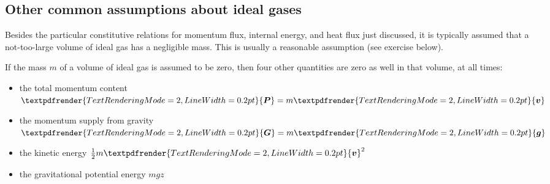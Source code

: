 \documentclass[a4paper,12pt,%
onecolumn,oneside,%
british%
]{memoir}
\renewcommand*{\bm}[1]{\textpdfrender{TextRenderingMode=2,LineWidth=0.2pt}{\boldsymbol{#1}}}
\renewcommand*{\|}[1][]{\nonscript\:#1\vert\nonscript\:\mathopen{}}
\newcommand*{\yg}{\bm{g}} %
\newcommand*{\yv}{\bm{v}}
\newcommand*{\ym}{m}%
\newcommand*{\yP}{\bm{P}}
\newcommand*{\yG}{\bm{G}}
\begin{document}
\subsection{Other common assumptions about ideal gases}
\label{sec:further_idealgas}

Besides the particular constitutive relations for momentum flux, internal energy, and heat flux just discussed, it is typically assumed that a not-too-large volume of ideal gas has a negligible mass. This is usually a reasonable assumption (see exercise below).

If the mass $\ym$ of a volume of ideal gas is assumed to be zero, then four other quantities are zero as well in that volume, at all times:
\begin{itemize}[nosep]
\item the total momentum content $\yP=\ym\yv$
\item the momentum supply from gravity $\yG=\ym\yg$
\item the kinetic energy $\tfrac12\ym\yv^{2}$
\item the gravitational potential energy $\ym g z$
\end{itemize}
\end{document}
